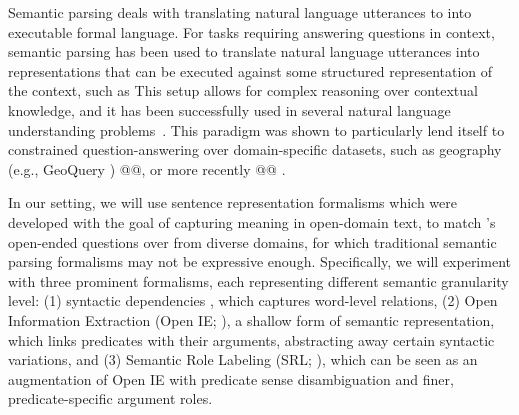 
Semantic parsing deals with translating natural language utterances to
into executable formal language. For tasks requiring answering questions in context, semantic parsing
has been used to translate natural language utterances into representations that can be
executed against some structured representation of the context, such as 
This setup allows for complex reasoning over contextual knowledge, and it has
been successfully used in several natural language understanding
problems~\citep[among others]{berant2013semantic,Yin2017ASN,chen2011learning}.
This paradigm was shown to particularly lend itself to constrained question-answering
over domain-specific datasets, such as geography (e.g., GeoQuery \cite{geoquery})
@@, or more recently @@ .

In our setting, we will use sentence representation formalisms which were
developed with the goal of capturing meaning in open-domain text, to match \drop's
open-ended questions over from diverse domains,
for which traditional semantic parsing formalisms may not be expressive enough.
Specifically, we will experiment with three prominent formalisms, each
representing different semantic granularity level:
(1) syntactic dependencies \cite{sd}, which captures word-level relations, 
(2) Open Information Extraction (Open IE; \cite{oie}), a shallow
form of semantic representation, which links predicates
with their arguments, abstracting away certain syntactic variations, and
(3) Semantic Role Labeling (SRL; \cite{srl}), which can be seen as an
augmentation of Open IE with predicate sense disambiguation and finer, predicate-specific
argument roles.

